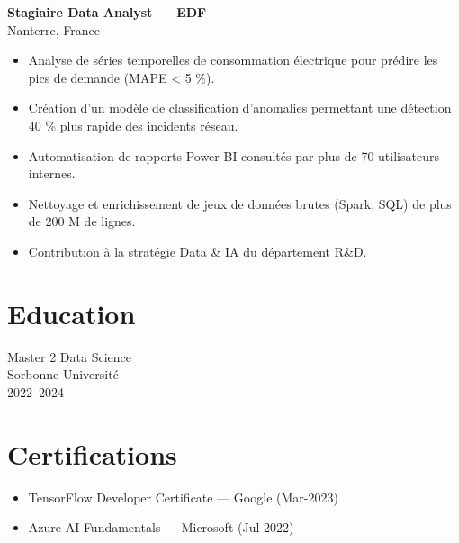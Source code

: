 \documentclass[10pt,letterpaper]{article}
\begin{document}
\begin{paracol}{2}
\begin{rightcolumn}
\begin{tcolorbox}
  \begin{minipage}[t]{0.48\linewidth}
    \textbf{Stagiaire Data Analyst — EDF}\\
    Nanterre, France
    \begin{itemize}
      \item Analyse de séries temporelles de consommation électrique pour prédire les pics de demande (MAPE < 5 \%).
      \item Création d’un modèle de classification d’anomalies permettant une détection 40 \% plus rapide des incidents réseau.
      \item Automatisation de rapports Power BI consultés par plus de 70 utilisateurs internes.
      \item Nettoyage et enrichissement de jeux de données brutes (Spark, SQL) de plus de 200 M de lignes.
      \item Contribution à la stratégie Data \& IA du département R\&D.
    \end{itemize}
  \end{minipage}\hfill
  \begin{minipage}[t]{0.48\linewidth}
    \raggedleft
  \end{minipage}
\end{tcolorbox}

\vspace{0.9in}

\section*{Education}
\begin{tcolorbox}[colback=white,boxrule=1pt,colframe=primary]
  \begin{minipage}{0.47\linewidth}
    Master 2 Data Science\\
    Sorbonne Université\\
    2022–2024
  \end{minipage}
\end{tcolorbox}

\section*{Certifications}
\begin{itemize}
  \item TensorFlow Developer Certificate — Google (Mar-2023)
  \item Azure AI Fundamentals — Microsoft (Jul-2022)
\end{itemize}

\end{rightcolumn}

\end{paracol}
\end{document}
